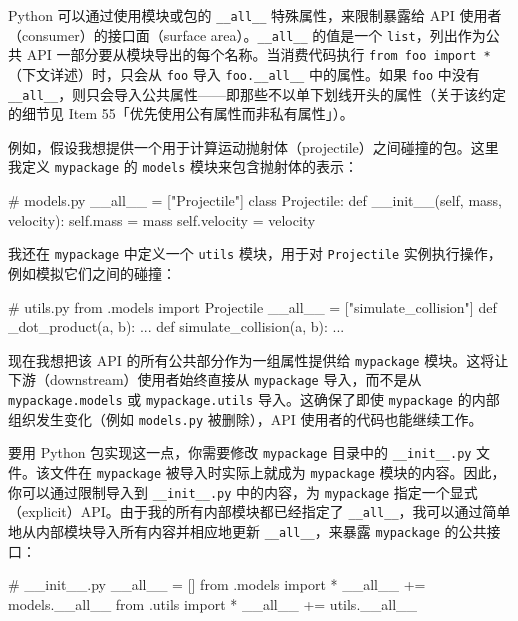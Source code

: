 Python 可以通过使用模块或包的 \texttt{\_\_all\_\_} 特殊属性，来限制暴露给 API 使用者（consumer）的接口面（surface area）。\texttt{\_\_all\_\_} 的值是一个 \texttt{list}，列出作为公共 API 一部分要从模块导出的每个名称。当消费代码执行 \texttt{from foo import *}（下文详述）时，只会从 \texttt{foo} 导入 \texttt{foo.\_\_all\_\_} 中的属性。如果 \texttt{foo} 中没有 \texttt{\_\_all\_\_}，则只会导入公共属性——即那些不以单下划线开头的属性（关于该约定的细节见 Item 55「优先使用公有属性而非私有属性」）。

例如，假设我想提供一个用于计算运动抛射体（projectile）之间碰撞的包。这里我定义 \texttt{mypackage} 的 \texttt{models} 模块来包含抛射体的表示：

\begin{codebox}[python]
# models.py
__all__ = ["Projectile"]
class Projectile:
    def __init__(self, mass, velocity):
        self.mass = mass
        self.velocity = velocity
\end{codebox}

我还在 \texttt{mypackage} 中定义一个 \texttt{utils} 模块，用于对 \texttt{Projectile} 实例执行操作，例如模拟它们之间的碰撞：

\begin{codebox}[python]
# utils.py
from .models import Projectile
__all__ = ["simulate_collision"]
def _dot_product(a, b):
    ...
def simulate_collision(a, b):
    ...
\end{codebox}

现在我想把该 API 的所有公共部分作为一组属性提供给 \texttt{mypackage} 模块。这将让下游（downstream）使用者始终直接从 \texttt{mypackage} 导入，而不是从 \texttt{mypackage.models} 或 \texttt{mypackage.utils} 导入。这确保了即使 \texttt{mypackage} 的内部组织发生变化（例如 \texttt{models.py} 被删除），API 使用者的代码也能继续工作。

要用 Python 包实现这一点，你需要修改 \texttt{mypackage} 目录中的 \texttt{\_\_init\_\_.py} 文件。该文件在 \texttt{mypackage} 被导入时实际上就成为 \texttt{mypackage} 模块的内容。因此，你可以通过限制导入到 \texttt{\_\_init\_\_.py} 中的内容，为 \texttt{mypackage} 指定一个显式（explicit）API。由于我的所有内部模块都已经指定了 \texttt{\_\_all\_\_}，我可以通过简单地从内部模块导入所有内容并相应地更新 \texttt{\_\_all\_\_}，来暴露 \texttt{mypackage} 的公共接口：

\begin{codebox}[python]
# __init__.py
__all__ = []
from .models import *
__all__ += models.__all__
from .utils import *
__all__ += utils.__all__
\end{codebox}

